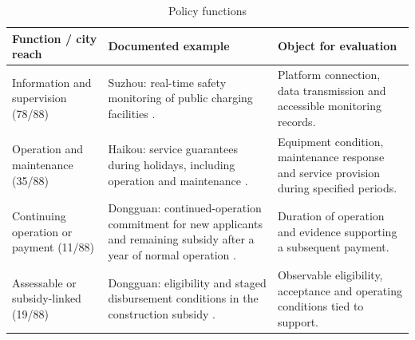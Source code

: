 \begin{table}[htbp]\centering\small
\caption{Policy functions}\label{tab:policy_functions}
\begin{tabular}{@{}p{.23\linewidth}p{.37\linewidth}p{.31\linewidth}@{}}
\toprule
Function / city reach & Documented example & Object for evaluation\\\midrule
Information and supervision (78/88) & Suzhou: real-time safety monitoring of public charging facilities \citep{gov12}. & Platform connection, data transmission and accessible monitoring records.\\
Operation and maintenance (35/88) & Haikou: service guarantees during holidays, including operation and maintenance \citep{gov7}. & Equipment condition, maintenance response and service provision during specified periods.\\
Continuing operation or payment (11/88) & Dongguan: continued-operation commitment for new applicants and remaining subsidy after a year of normal operation \citep{gov1}. & Duration of operation and evidence supporting a subsequent payment.\\
Assessable or subsidy-linked (19/88) & Dongguan: eligibility and staged disbursement conditions in the construction subsidy \citep{gov1}. & Observable eligibility, acceptance and operating conditions tied to support.\\
\bottomrule\end{tabular}
\end{table}
